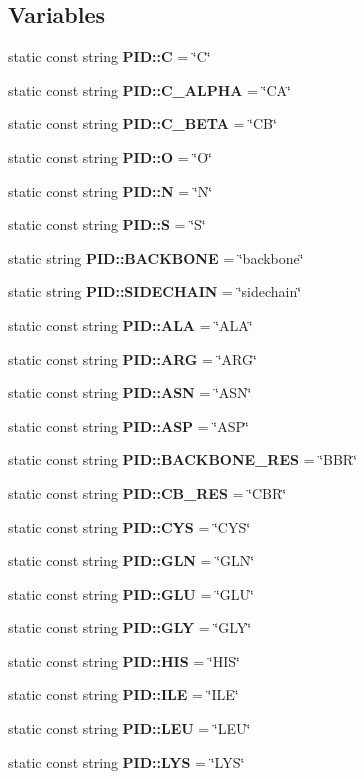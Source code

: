 \subsection*{Variables}
\begin{CompactItemize}
\item 
static const string {\bf PID::C} = \char`\"{}C\char`\"{}
\item 
static const string {\bf PID::C\_\-ALPHA} = \char`\"{}CA\char`\"{}
\item 
static const string {\bf PID::C\_\-BETA} = \char`\"{}CB\char`\"{}
\item 
static const string {\bf PID::O} = \char`\"{}O\char`\"{}
\item 
static const string {\bf PID::N} = \char`\"{}N\char`\"{}
\item 
static const string {\bf PID::S} = \char`\"{}S\char`\"{}
\item 
static string {\bf PID::BACKBONE} = \char`\"{}backbone\char`\"{}
\item 
static string {\bf PID::SIDECHAIN} = \char`\"{}sidechain\char`\"{}
\item 
static const string {\bf PID::ALA} = \char`\"{}ALA\char`\"{}
\item 
static const string {\bf PID::ARG} = \char`\"{}ARG\char`\"{}
\item 
static const string {\bf PID::ASN} = \char`\"{}ASN\char`\"{}
\item 
static const string {\bf PID::ASP} = \char`\"{}ASP\char`\"{}
\item 
static const string {\bf PID::BACKBONE\_\-RES} = \char`\"{}BBR\char`\"{}
\item 
static const string {\bf PID::CB\_\-RES} = \char`\"{}CBR\char`\"{}
\item 
static const string {\bf PID::CYS} = \char`\"{}CYS\char`\"{}
\item 
static const string {\bf PID::GLN} = \char`\"{}GLN\char`\"{}
\item 
static const string {\bf PID::GLU} = \char`\"{}GLU\char`\"{}
\item 
static const string {\bf PID::GLY} = \char`\"{}GLY\char`\"{}
\item 
static const string {\bf PID::HIS} = \char`\"{}HIS\char`\"{}
\item 
static const string {\bf PID::ILE} = \char`\"{}ILE\char`\"{}
\item 
static const string {\bf PID::LEU} = \char`\"{}LEU\char`\"{}
\item 
static const string {\bf PID::LYS} = \char`\"{}LYS\char`\"{}

\end{CompactItemize}
